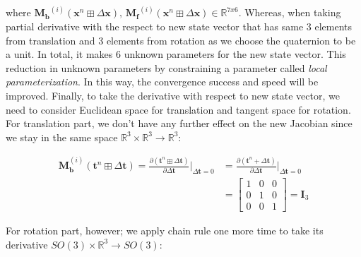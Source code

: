 \documentclass[12pt]{report}
\numberwithin{figure}{section}
\newcommand{\R}{\mathbb{R}}
\begin{document}
\begin{appendices}
where $\mathbf{M_b}^{(i)}(\mathbf{x}^n\boxplus \Delta \mathbf{x}) \text{, } 
\mathbf{M_f}^{(i)}(\mathbf{x}^n\boxplus \Delta \mathbf{x}) \in \R^{7x6}$.
Whereas, when taking partial derivative with the respect to 
new state vector that has same 3 elements from translation and 3 elements from 
rotation as we choose the quaternion to be a unit.
In total, it makes 6 unknown parameters for the new state vector. 
This reduction in unknown parameters by constraining a parameter 
called \textit{local parameterization}. In this way, the convergence success 
and 
speed will be improved. 
Finally, to take the derivative with respect to new state vector, we need to consider 
Euclidean space for translation and tangent space for rotation. For translation part, 
we don't have any further effect on the new Jacobian since we stay in the same space 
$\R^3 \times \R^3 \rightarrow \R^3$:

\begin{equation}
  \begin{aligned}
  \mathbf{M}^{(i)}_{\mathbf{b}}(\mathbf{t}^n \boxplus \Delta \mathbf{t}) = 
    \frac{\partial (\mathbf{t}^{n} \boxplus \Delta \mathbf{t})}{\partial \Delta \mathbf{t}} 
    \bigg|_{\Delta \mathbf{t} = 0} & =
  \frac{\partial (\mathbf{t}^{n} + \Delta \mathbf{t})}{\partial \Delta \mathbf{t}}
    \bigg|_{\Delta \mathbf{t} = 0} \\
    & =
      \begin{bmatrix} 
        1 & 0 & 0 \\  
        0 & 1 & 0 \\  
        0 & 0 & 1
      \end{bmatrix} = \mathbf{I}_3
  \end{aligned}
\end{equation}

For rotation part, however; we apply chain rule one more time to take its derivative 
$SO(3) \times \R^3 \rightarrow SO(3)$:


\end{appendices}
\end{document}

